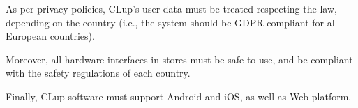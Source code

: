 \documentclass[../../main.tex]{subfiles}
\begin{document}
	As per privacy policies, CLup's user data must be treated respecting the law, depending on the 
	country (i.e., the system should be GDPR compliant for all European countries).

	Moreover, all hardware interfaces in stores must be safe to use, and be compliant with the safety regulations of each country.
	
	Finally, CLup software must support Android and iOS, as well as Web platform.
\end{document}
